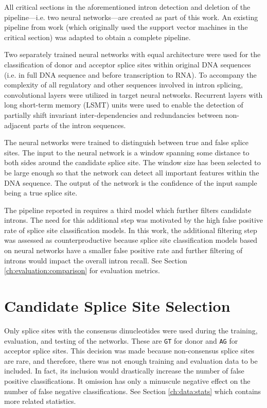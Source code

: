 All critical sections in the aforementioned intron detection and deletion of
the pipeline---i.e. two neural networks---are created as part of this work. An
existing pipeline from work \cite{barucic} (which originally used the support
vector machines in the critical section) was adapted to obtain a complete
pipeline.

Two separately trained neural networks with equal architecture were used for
the classification of donor and acceptor splice sites within original DNA
sequences (i.e. in full DNA sequence and before transcription to RNA). To
accompany the complexity of all regulatory and other sequences involved in
intron splicing, convolutional layers were utilized in target neural networks.
Recurrent layers with long short-term memory (LSMT) units were used to enable
the detection of partially shift invariant inter-dependencies and redundancies
between non-adjacent parts of the intron sequences.

The neural networks were trained to distinguish between true and false splice
sites. The input to the neural network is a window spanning some distance to
both sides around the candidate splice site. The window size has been selected
to be large enough so that the network can detect all important features within
the DNA sequence. The output of the network is the confidence of the input
sample being a true splice site.

The pipeline reported in \cite{barucic} requires a third model which further
filters candidate introns. The need for this additional step was motivated by
the high false positive rate of splice site classification models. In this
work, the additional filtering step was assessed as counterproductive because
splice site classification models based on neural networks have a smaller false
positive rate and further filtering of introns would impact the overall intron
recall. See Section \ref{ch:evaluation:comparison} for evaluation metrics.

\section{\label{ch:rcnn:candidates}Candidate Splice Site Selection}

Only splice sites with the consensus dinucleotides were used during the
training, evaluation, and testing of the networks. These are \Verb_GT_ for
donor and \Verb_AG_ for acceptor splice sites. This decision was made because
non-consensus splice sites are rare, and therefore, there was not enough
training and evaluation data to be included. In fact, its inclusion would
drastically increase the number of false positive classifications. It omission
has only a minuscule negative effect on the number of false negative
classifications. See Section \ref{ch:data:stats} which contains more related
statistics.

